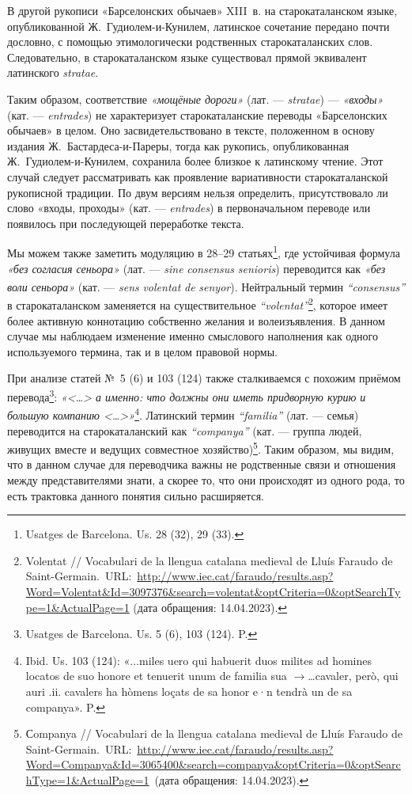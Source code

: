 В другой рукописи «Барселонских обычаев» XIII~в. на старокаталанском языке, опубликованной Ж.~Гудиолем-и-Кунилем, латинское сочетание передано почти дословно, с помощью этимологически родственных старокаталанских слов. Следовательно, в старокаталанском языке существовал прямой эквивалент латинского \emph{stratae}.

Таким образом, соответствие \emph{«мощёные дороги»} (лат. --- \emph{stratae}) --- \emph{«входы»} (кат. --- \emph{entrades}) не характеризует старокаталанские переводы «Барселонских обычаев» в целом. Оно засвидетельствовано в тексте, положенном в основу издания Ж.~Бастардеса-и-Пареры, тогда как рукопись, опубликованная Ж.~Гудиолем-и-Кунилем, сохранила более близкое к латинскому чтение. Этот случай следует рассматривать как проявление вариативности старокаталанской рукописной традиции. По двум версиям нельзя определить, присутствовало ли слово «входы, проходы» (кат. --- \emph{entrades}) в первоначальном переводе или появилось при последующей переработке текста.

Мы можем также заметить модуляцию в 28--29 статьях\footnote{Usatges de Barcelona. Us. 28 (32), 29 (33).}, где устойчивая формула \emph{«без согласия сеньора» }(лат. --- \emph{sine}\emph{ }\emph{consensus}\emph{ }\emph{senioris}) переводится как \emph{«без воли сеньора»} (кат. --- \emph{sens}\emph{ }\emph{volentat}\emph{ }\emph{de}\emph{ }\emph{senyor}). Нейтральный термин \emph{“}\emph{consensus}\emph{”}\textsuperscript{ }в старокаталанском заменяется на существительное \emph{“}\emph{volentat}\emph{”}\footnote{Volentat // Vocabulari de la llengua catalana medieval de Lluís Faraudo de Saint-Germain.~URL:~\url{http://www.iec.cat/faraudo/results.asp?Word=Volentat&Id=3097376&search=volentat&optCriteria=0&optSearchType=1&ActualPage=1} (дата обращения: 14.04.2023).}, которое имеет более активную коннотацию собственно желания и волеизъявления. В данном случае мы наблюдаем изменение именно смыслового наполнения как одного используемого термина, так и в целом правовой нормы.

При анализе статей №~5 (6) и 103 (124) также сталкиваемся с похожим приёмом перевода\footnote{Usatges de Barcelona. Us. 5 (6), 103 (124). P.}: \emph{«<…> а именно: что должны они иметь придворную курию и большую компанию <…>»}\footnote{Ibid. Us. 103 (124): «...miles uero qui habuerit duos milites ad homines locatos de suo honore et tenuerit unum de familia sua $\rightarrow$…cavaler, però, qui auri .ii. cavalers ha hòmens loçats de sa honor e·n tendrà un de sa companya». P.}. Латинский термин \emph{“}\emph{familia}\emph{” }(лат. --- семья) переводится на старокаталанский как \emph{“}\emph{companya}\emph{”} (кат. --- группа людей, живущих вместе и ведущих совместное хозяйство)\footnote{Сompanya // Vocabulari de la llengua catalana medieval de Lluís Faraudo de Saint-Germain.~URL:~\url{http://www.iec.cat/faraudo/results.asp?Word=Companya&Id=3065400&search=companya&optCriteria=0&optSearchType=1&ActualPage=1}~(дата обращения: 14.04.2023).}. Таким образом, мы видим, что в данном случае для переводчика важны не родственные связи и отношения между представителями знати, а скорее то, что они происходят из одного рода, то есть трактовка данного понятия сильно расширяется.

